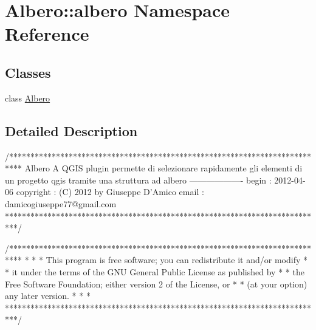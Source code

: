 \hypertarget{namespaceAlbero_1_1albero}{
\section{Albero::albero Namespace Reference}
\label{namespaceAlbero_1_1albero}
}
\subsection*{Classes}
\begin{DoxyCompactItemize}
\item 
class \hyperlink{classAlbero_1_1albero_1_1Albero}{Albero}
\end{DoxyCompactItemize}


\subsection{Detailed Description}
\begin{DoxyVerb}
/***************************************************************************
 Albero
                                                             A QGIS plugin
 permette di selezionare rapidamente gli elementi di un progetto qgis tramite una struttura ad albero
                                                      -------------------
            begin				: 2012-04-06
            copyright			: (C) 2012 by Giuseppe D'Amico
            email				: damicogiuseppe77@gmail.com
 ***************************************************************************/

/***************************************************************************
 *																		 *
 *   This program is free software; you can redistribute it and/or modify  *
 *   it under the terms of the GNU General Public License as published by  *
 *   the Free Software Foundation; either version 2 of the License, or	 *
 *   (at your option) any later version.								   *
 *																		 *
 ***************************************************************************/
\end{DoxyVerb}
 